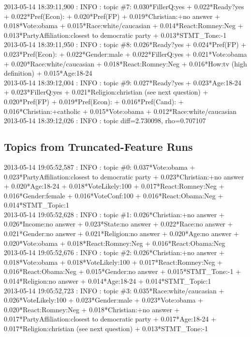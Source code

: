 2013-05-14 18:39:11,900 : INFO : topic \#7: 0.030*FillerQ:yes + 0.022*Ready?yes + 0.022*Pref(Econ): + 0.020*Pref(FP) + 0.019*Christian:+no answer + 0.018*Vote:obama + 0.015*Race:white/caucasian + 0.014*React:Romney:Neg + 0.013*PartyAffiliation:closest to democratic party + 0.013*STMT_Tone:-1\\

2013-05-14 18:39:11,950 : INFO : topic \#8: 0.026*Ready?yes + 0.024*Pref(FP) + 0.023*Pref(Econ): + 0.022*Gender:male + 0.022*FillerQ:yes + 0.021*Vote:obama + 0.020*Race:white/caucasian + 0.018*React:Romney:Neg + 0.016*How:tv (high definition) + 0.015*Age:18-24\\

2013-05-14 18:39:12,004 : INFO : topic \#9: 0.027*Ready?yes + 0.023*Age:18-24 + 0.023*FillerQ:yes + 0.021*Religion:christian (see next question) + 0.020*Pref(FP) + 0.019*Pref(Econ): + 0.016*Pref(Cand): + 0.016*Christian:+catholic + 0.015*Vote:obama + 0.012*Race:white/caucasian\\

2013-05-14 18:39:12,026 : INFO : topic diff=2.730098, rho=0.707107



\subsection{Topics from Truncated-Feature Runs}

2013-05-14 19:05:52,587 : INFO : topic \#0: 0.037*Vote:obama + 0.023*PartyAffiliation:closest to democratic party + 0.023*Christian:+no answer + 0.020*Age:18-24 + 0.018*VoteLikely:100 + 0.017*React:Romney:Neg + 0.016*Gender:female + 0.016*VoteConf:100 + 0.016*React:Obama:Neg + 0.014*STMT_Topic:1\\

2013-05-14 19:05:52,628 : INFO : topic \#1: 0.026*Christian:+no answer + 0.026*Income:no answer + 0.023*State:no answer + 0.022*Race:no answer + 0.021*Gender:no answer + 0.021*Religion:no answer + 0.020*Age:no answer + 0.020*Vote:obama + 0.018*React:Romney:Neg + 0.016*React:Obama:Neg\\

2013-05-14 19:05:52,676 : INFO : topic \#2: 0.026*Christian:+no answer + 0.018*Vote:obama + 0.018*VoteLikely:100 + 0.017*React:Romney:Neg + 0.016*React:Obama:Neg + 0.015*Gender:no answer + 0.015*STMT_Tone:-1 + 0.014*Religion:no answer + 0.014*Age:18-24 + 0.014*STMT_Topic:1\\

2013-05-14 19:05:52,723 : INFO : topic \#3: 0.035*Race:white/caucasian + 0.026*VoteLikely:100 + 0.023*Gender:male + 0.023*Vote:obama + 0.020*React:Romney:Neg + 0.018*Christian:+no answer + 0.017*PartyAffiliation:closest to democratic party + 0.017*Age:18-24 + 0.017*Religion:christian (see next question) + 0.013*STMT_Tone:-1\\

